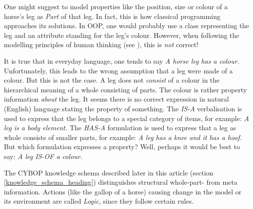 One might suggest to model properties like the position, size or colour of a
horse's leg as \emph{Part} of that leg. In fact, this is how classical
programming approaches its solutions. In OOP, one would probably use a class
representing the leg and an attribute standing for the leg's colour. However,
when following the modelling principles of human thinking (see
\cite{heller2004}), this is \emph{not} correct!

It is true that in everyday language, one tends to say \textit{A horse leg
\emph{has a} colour.} Unfortunately, this leads to the wrong assumption that a
leg were made of a colour. But this is not the case. A leg does not
\emph{consist} of a colour in the hierarchical meaning of a whole consisting of
parts. The colour is rather property information \emph{about} the leg. It seems
there is no correct expression in natural (English) language stating the
property of something. The \emph{IS-A} verbalisation is used to express that
the leg belongs to a special category of items, for example: \textit{A leg is a
body element.} The \emph{HAS-A} formulation is used to express that a leg as
whole consists of smaller parts, for example: \textit{A leg has a knee and it
has a hoof.} But which formulation expresses a property? Well, perhaps it would
be best to say: \textit{A leg IS-OF a colour.}

The CYBOP knowledge schema described later in this article (section
\ref{knowledge_schema_heading}) distinguishes structural whole-part- from meta
information. Actions (like the gallop of a horse) causing change in the model
or its environment are called \emph{Logic}, since they follow certain rules.

